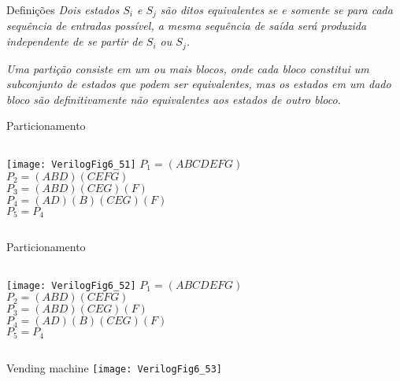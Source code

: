 

\subtitle{Máquinas de Estados Finitos: Minimização} %



\begin{frame}
	\titlepage
\end{frame} 

\begin{frame}{Definições} \centering
\textit{    Dois estados $S_i$ e $S_j$ são ditos equivalentes se e somente se para cada sequência de entradas possível, a mesma sequência de saída será produzida independente de se partir de $S_i$ ou $S_j$.}

\vspace{1cm}

\textit{Uma partição consiste em um ou mais blocos, onde cada bloco constitui um subconjunto de estados que podem ser equivalentes, mas os estados em um dado bloco são definitivamente não equivalentes aos estados de outro bloco.}
\end{frame}


\begin{frame}[fragile]{Particionamento} \centering
    \begin{columns}
            \texttt{[image: VerilogFig6\_51]} 
            $P_1 = (ABCDEFG)$ \\
            \pause
            $P_2 = (ABD)(CEFG)$ \\
            \pause
            $P_3 = (ABD)(CEG)(F)$ \\
            \pause
            $P_4 = (AD)(B)(CEG)(F)$ \\
            \pause
            $P_5 = P_4$ \\
    \end{columns}
\end{frame}

\begin{frame}[fragile]{Particionamento} \centering
    \begin{columns}
            \texttt{[image: VerilogFig6\_52]} 
            $P_1 = (ABCDEFG)$ \\
            $P_2 = (ABD)(CEFG)$ \\
            $P_3 = (ABD)(CEG)(F)$ \\
            $P_4 = (AD)(B)(CEG)(F)$ \\
            $P_5 = P_4$ \\
    \end{columns}
\end{frame}
\begin{frame}{Vending machine} \centering
    \texttt{[image: VerilogFig6\_53]}
\end{frame}

